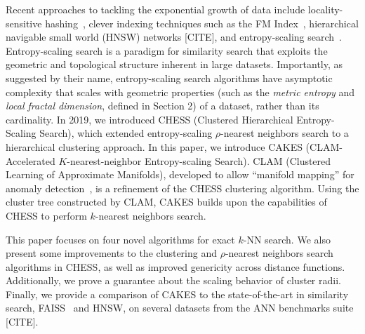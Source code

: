 Recent approaches to tackling the exponential growth of data include locality-sensitive hashing~\cite{indyk1999sublinear}, 
clever indexing techniques such as the FM Index~\cite{simpson2010efficient}, hierarchical navigable small world (HNSW) networks [CITE], and entropy-scaling search~\cite{yu2015entropy, ishaq2019clustered}. 
Entropy-scaling search is a paradigm for similarity search that exploits the geometric and topological structure inherent in large datasets.
Importantly, as suggested by their name, entropy-scaling search algorithms have asymptotic complexity that scales with geometric properties (such as the 
\emph{metric entropy} and \emph{local fractal dimension}, defined in Section 2) of a dataset,
rather than its cardinality. In 2019, we introduced CHESS (Clustered Hierarchical Entropy-Scaling Search), which extended entropy-scaling $\rho$-nearest 
neighbors search to a hierarchical clustering approach. In this paper, we introduce CAKES (CLAM-Accelerated $K$-nearest-neighbor 
Entropy-scaling Search). CLAM (Clustered Learning of Approximate Manifolds), developed to allow ``manifold mapping'' for anomaly detection~\cite{ishaq2021clustered}, is a refinement of the CHESS clustering algorithm. 
Using the cluster tree constructed by CLAM, CAKES builds upon the capabilities of CHESS to perform
$k$-nearest neighbors search. 


This paper focuses on four novel algorithms for exact $k$-NN search. We also present some 
improvements to the clustering and $\rho$-nearest neighbors search algorithms in CHESS, 
as well as improved genericity across distance functions. Additionally, we prove a guarantee about the scaling behavior of cluster radii. 
Finally, we provide a comparison of 
CAKES to the state-of-the-art in similarity search, FAISS~\cite{johnson2019billion} and HNSW, on several datasets 
from the ANN benchmarks suite [CITE].